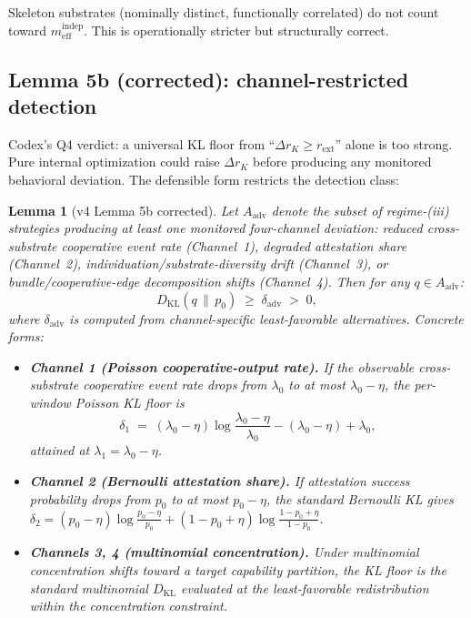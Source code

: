 \documentclass{article}
\newtheorem{lemma}{Lemma}
\newcommand{\rext}{r_{\mathrm{ext}}}
\newcommand{\meff}{m_{\mathrm{eff}}}
\begin{document}
Skeleton substrates (nominally distinct, functionally correlated) do
not count toward $\meff^{\mathrm{indep}}$.  This is operationally
stricter but structurally correct.

\subsection{Lemma 5b (corrected): channel-restricted detection}

Codex's Q4 verdict: a universal KL floor from ``$\Delta r_K \geq
\rext$'' alone is too strong.  Pure internal optimization could raise
$\Delta r_K$ before producing any monitored behavioral deviation.  The
defensible form restricts the detection class:

\begin{lemma}[v4 Lemma 5b corrected]
\label{lem:v4b}
Let $A_{\mathrm{adv}}$ denote the subset of regime-(iii) strategies
producing at least one monitored four-channel deviation: reduced
cross-substrate cooperative event rate (Channel~1), degraded
attestation share (Channel~2), individuation/substrate-diversity drift
(Channel~3), or bundle/cooperative-edge decomposition shifts
(Channel~4).  Then for any $q \in A_{\mathrm{adv}}$:
\begin{equation}
\label{eq:kl_restricted}
D_{\mathrm{KL}}(q \,\|\, p_0) \;\geq\; \delta_{\mathrm{adv}}
  \;>\; 0,
\end{equation}
where $\delta_{\mathrm{adv}}$ is computed from channel-specific
least-favorable alternatives.  Concrete forms:
\begin{itemize}
\item \textbf{Channel 1 (Poisson cooperative-output rate).}  If
  the observable cross-substrate cooperative event rate drops from
  $\lambda_0$ to at most $\lambda_0 - \eta$, the per-window Poisson
  KL floor is
  \[
    \delta_1 \;=\; (\lambda_0 - \eta) \log\!\frac{\lambda_0 -
    \eta}{\lambda_0} - (\lambda_0 - \eta) + \lambda_0,
  \]
  attained at $\lambda_1 = \lambda_0 - \eta$.
\item \textbf{Channel 2 (Bernoulli attestation share).}  If
  attestation success probability drops from $p_0$ to at most $p_0 -
  \eta$, the standard Bernoulli KL gives $\delta_2 = (p_0 - \eta)
  \log\frac{p_0 - \eta}{p_0} + (1 - p_0 + \eta) \log\frac{1 - p_0 +
  \eta}{1 - p_0}$.
\item \textbf{Channels 3, 4 (multinomial concentration).}  Under
  multinomial concentration shifts toward a target capability
  partition, the KL floor is the standard multinomial $D_{\mathrm{KL}}$
  evaluated at the least-favorable redistribution within the
  concentration constraint.
\end{itemize}
\end{lemma}
\end{document}
